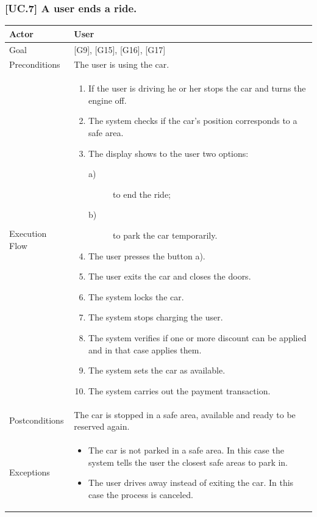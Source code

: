\documentclass[english]{article}
\begin{document}
	\subsubsection{[UC.7] A user ends a ride.}
	\begin{tabularx}{\textwidth}{  l  X  }
		\hline
		Actor & User\\
		\hline
		Goal & [G9], [G15], [G16], [G17]\\
		\hline
		Preconditions & The user is using the car.\\
		\hline
		Execution Flow & \begin{enumerate}
			\item{If the user is driving he or her stops the car and turns the engine off.}
			\item{The system checks if the car's position corresponds to a safe area.}
			\item{The display shows to the user two options:
				\begin{description}
					\item[a)]{ to end the ride;}
					\item[b)]{ to park the car temporarily.}
				\end{description}}
				\item{The user presses the button a).}
				\item{The user exits the car and closes the doors.}
				\item{The system locks the car.}
				\item{The system stops charging the user.}
        \item{The system verifies if one or more discount can be applied and in that case applies them.}
				\item{The system sets the car as available.}
				\item{The system carries out the payment transaction.}
			\end{enumerate}\\
			\hline
			Postconditions & The car is stopped in a safe area, available and ready to be reserved again.\\
			\hline
			Exceptions & \begin{itemize}
				\item{The car is not parked in a safe area. In this case the system tells the user the closest safe areas to park in.}
				\item{The user drives away instead of exiting the car. In this case the process is canceled.}
			\end{itemize}\\
			\hline
		\end{tabularx}
\end{document}
